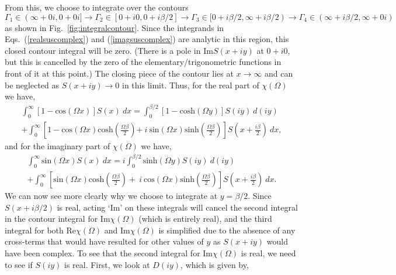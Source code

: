 From this, we choose to integrate over the contours $\Gamma_1 \in (\infty + 0i, 0 + 0i] \rightarrow \Gamma_2 \in [0 + i0, 0 + i\beta/2] \rightarrow \Gamma_3 \in [0 + i\beta/2, \infty + i\beta/2) \rightarrow \Gamma_4 \in (\infty + i\beta/2, \infty + 0i)$ as shown in Fig.~\ref{fig:integralcontour}. Since the integrands in Eqs.~(\ref{realsuscomplex}) and (\ref{imagsuscomplex}) are analytic in this region, this closed contour integral will be zero. 
(There is a pole in $\textrm{Im}S(x+iy)$ at $0 + i0$, but this is cancelled by the zero of the elementary/trigonometric functions in front of it at this point.) 
The closing piece of the contour lies at $x \rightarrow \infty$ and can be neglected as $S(x+iy) \rightarrow 0$ in this limit. Thus, for the real part of $\chi(\Omega)$ we have,
\begin{equation}
    \begin{gathered}
        \int_0^\infty \left[ 1 - \textrm{cos}(\Omega x) \right] S(x)\ dx =
        \int_0^{\beta / 2} \left[ 1 - \textrm{cosh}(\Omega y) \right] S(iy)\ d(iy) \\ 
        + \int_0^\infty \left[ 1 - \textrm{cos}(\Omega x) \textrm{cosh}\left(\frac{\Omega \beta}{2}\right)\right. 
        \left.+\ i\ \textrm{sin}(\Omega x) \textrm{sinh}\left(\frac{\Omega \beta}{2}\right) \right] S\left(x + \frac{i \beta}{2}\right)\ dx,
    \end{gathered}
\end{equation}
and for the imaginary part of $\chi(\Omega)$ we have,
\begin{equation}
    \begin{gathered}
        \int_0^\infty \textrm{sin}(\Omega x) S(x)\ dx =
        i\int_0^{\beta / 2} \textrm{sinh}(\Omega y) S(iy)\ d(iy) \\
        + \int_0^\infty \left[ \textrm{sin}(\Omega x) \textrm{cosh}\left(\frac{\Omega \beta}{2}\right) +\ i\ \textrm{cos}(\Omega x) \textrm{sinh}\left(\frac{\Omega \beta}{2}\right) \right] S\left(x + \frac{i \beta}{2}\right)\ dx.
    \end{gathered}
\end{equation}
We can now see more clearly why we choose to integrate at $y = \beta / 2$. Since $S(x + i\beta / 2)$ is real, acting `Im' on these integrals will cancel the second integral in the contour integral for $\textrm{Im}\chi(\Omega)$ (which is entirely real), and the third integral for both $\textrm{Re}\chi(\Omega)$ and $\textrm{Im}\chi(\Omega)$ is simplified due to the absence of any cross-terms that would have resulted for other values of $y$ as $S(x + iy)$ would have been complex. To see that the second integral for $\textrm{Im}\chi(\Omega)$ is real, we need to see if $S(iy)$ is real. First, we look at $D(iy)$, which is given by,
